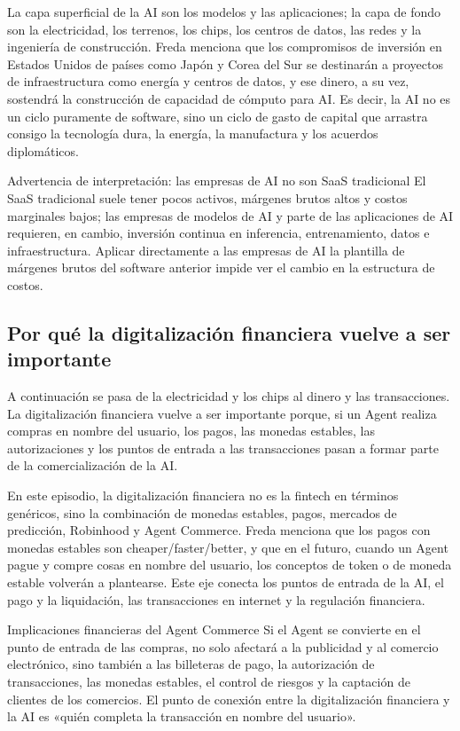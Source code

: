 La capa superficial de la AI son los modelos y las aplicaciones; la capa de fondo son la electricidad, los terrenos, los chips, los centros de datos, las redes y la ingeniería de construcción. Freda menciona que los compromisos de inversión en Estados Unidos de países como Japón y Corea del Sur se destinarán a proyectos de infraestructura como energía y centros de datos, y ese dinero, a su vez, sostendrá la construcción de capacidad de cómputo para AI. Es decir, la AI no es un ciclo puramente de software, sino un ciclo de gasto de capital que arrastra consigo la tecnología dura, la energía, la manufactura y los acuerdos diplomáticos.

\begin{warningbox}{Advertencia de interpretación: las empresas de AI no son SaaS tradicional}
El SaaS tradicional suele tener pocos activos, márgenes brutos altos y costos marginales bajos; las empresas de modelos de AI y parte de las aplicaciones de AI requieren, en cambio, inversión continua en inferencia, entrenamiento, datos e infraestructura. Aplicar directamente a las empresas de AI la plantilla de márgenes brutos del software anterior impide ver el cambio en la estructura de costos.
\end{warningbox}

\subsection{Por qué la digitalización financiera vuelve a ser importante}

A continuación se pasa de la electricidad y los chips al dinero y las transacciones. La digitalización financiera vuelve a ser importante porque, si un Agent realiza compras en nombre del usuario, los pagos, las monedas estables, las autorizaciones y los puntos de entrada a las transacciones pasan a formar parte de la comercialización de la AI.

En este episodio, la digitalización financiera no es la fintech en términos genéricos, sino la combinación de monedas estables, pagos, mercados de predicción, Robinhood y Agent Commerce. Freda menciona que los pagos con monedas estables son cheaper/faster/better, y que en el futuro, cuando un Agent pague y compre cosas en nombre del usuario, los conceptos de token o de moneda estable volverán a plantearse. Este eje conecta los puntos de entrada de la AI, el pago y la liquidación, las transacciones en internet y la regulación financiera.

\begin{importantbox}{Implicaciones financieras del Agent Commerce}
Si el Agent se convierte en el punto de entrada de las compras, no solo afectará a la publicidad y al comercio electrónico, sino también a las billeteras de pago, la autorización de transacciones, las monedas estables, el control de riesgos y la captación de clientes de los comercios. El punto de conexión entre la digitalización financiera y la AI es «quién completa la transacción en nombre del usuario».
\end{importantbox}


